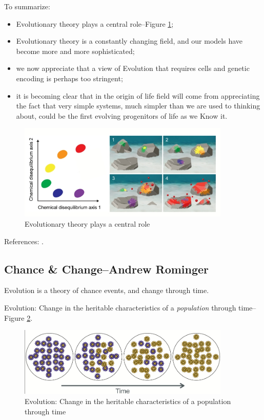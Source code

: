 \documentclass[]{article}
\begin{document}
To summarize:
\begin{itemize}
	\item Evolutionary theory plays a central role--Figure \ref{fig:Baum2018a};
	\item  Evolutionary theory is a constantly changing field, and our models have become more and more sophisticated;
	\item we now appreciate that a view of Evolution that requires cells and genetic encoding is perhaps too stringent;
	\item it is becoming clear that in the origin of life field will come from appreciating the fact that very simple systems, much simpler than we are used to thinking about, could be the first evolving progenitors of life as we Know it.
\end{itemize}


\begin{figure}[H]
	\caption[Evolutionary theory plays a central role]{Evolutionary theory plays a central role\cite{baum2018origin}}\label{fig:Baum2018a}
	\includegraphics[width=0.9\textwidth]{Baum2018a}
\end{figure}

References: \cite{hoyle1983intelligent,wang2015evolution,baum2018origin,baum2015selection}.

\subsection[Chance \& Change]{Chance \& Change--Andrew Rominger}


Evolution is a theory of chance events, and change through time.

Evolution: Change in the heritable characteristics of
a \textit{population} through time--Figure \ref{fig:ChangeThroughTime}.
\begin{figure}[H]
	\caption[Evolution]{Evolution: Change in the heritable characteristics of
		a population through time}\label{fig:ChangeThroughTime}
	\includegraphics[width=0.9\textwidth]{ChangeThroughTime}
\end{figure}
\end{document}
